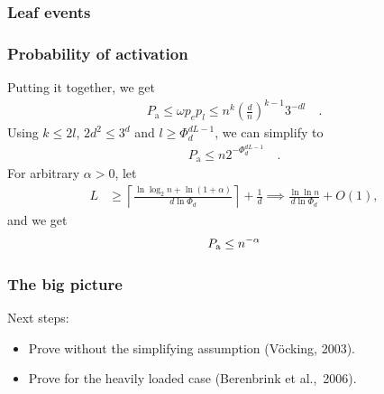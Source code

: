 \documentclass[professionalfonts]{beamer}
\newcommand\xqed[1]{%
   \rlap{\hbox to#1{\hfil\llap{\ensuremath{\qed}}}}
}
\begin{document}
\begin{frame}
\frametitle{Leaf events}

\end{frame}

\begin{frame}
\frametitle{Probability of activation}
Putting it together, we get
\begin{align*}
P_\mathrm{a} \leq \omega p_e p_l \leq  n^k \left(\frac{d}{n}\right)^{k-1} 3^{-dl} \quad .
\end{align*}
Using $ k\leq 2l$, $2d^2\leq 3^d$ and $l \geq \Phi_d^{dL-1}$, we can simplify to
\begin{align*}
P_\mathrm{a} \leq n 2 ^{-\Phi_d^{dL-1}} \quad .
\end{align*}
For arbitrary $\alpha > 0$, let
\begin{align*}
L &\geq \left\lceil{\frac{\ln\log_2 n + \ln\left(1+\alpha\right)}{d \ln \Phi_d}}\right\rceil+\frac{1}{d} \implies \frac{\ln\ln n}{d \ln \Phi_d} + O\left(1\right) ,
\end{align*}
and we get
\begin{align*}
P_\mathrm{a} \leq n^{-\alpha} \xqed{5cm}
\end{align*}
\end{frame}

\begin{frame}
\frametitle{The big picture}
\theoremVocking
\assumptionOne
\medskip 
Next steps:
\begin{itemize}
\item Prove \alert{without} the simplifying assumption (V\"ocking, 2003).
\item Prove for the \alert{heavily loaded} case (Berenbrink et al.,~2006).
\end{itemize}
\end{frame}
\end{document}
